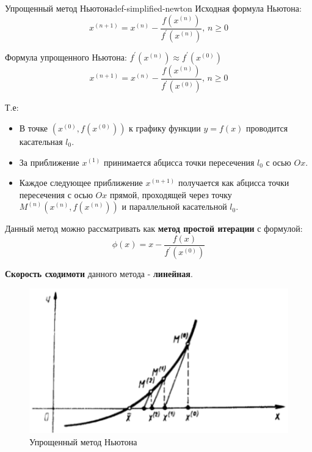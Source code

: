\documentclass[14pt]{extarticle}
\begin{document}
    \begin{definition}{Упрощенный метод Ньютона}{def-simplified-newton}
        Исходная формула Ньютона:
        $$x^{(n + 1)} = x^{(n)} - \frac{f(x^{(n)})}{f^{'}(x^{(n)})} \text{, } n \geq 0$$

        Формула упрощенного Ньютона: $f^{'}(x^{(n)}) \approx f^{'}(x^{(0)})$
        $$x^{(n + 1)} = x^{(n)} - \frac{f(x^{(n)})}{f^{'}(x^{(0)})} \text{, } n \geq 0$$
   
        Т.е:
        \begin{itemize}
            \item В точке $(x^{(0)}, f(x^{(0)}))$ к графику функции $y = f(x)$ проводится касательная $l_{0}$.
            \item За приближение $x^{(1)}$ принимается абцисса точки пересечения $l_{0}$ с осью $Ox$.
            \item Каждое следующее приближение $x^{(n + 1)}$ получается как абцисса точки пересечения с осью $Ox$ прямой, проходящей через точку $M^{(n)}(x^{(n)}, f(x^{(n)}))$ и параллельной касательной $l_{0}$.
        \end{itemize}

        \vspace{\baselineskip}

        Данный метод можно рассматривать как \textbf{метод простой итерации} с формулой:
        $$\phi(x) = x - \frac{f(x)}{f^{'}(x^{(0)})}$$

        \vspace{\baselineskip}

        \textbf{Скорость сходимоти} данного метода - \textbf{линейная}.
    \end{definition}

    \begin{figure}[H]
        \centering
        \includegraphics[scale=0.5]{images/simplified-newton-ex.png}
        \caption{Упрощенный метод Ньютона}
        \label{fig:simplified-newton-method}
    \end{figure}
\end{document}
